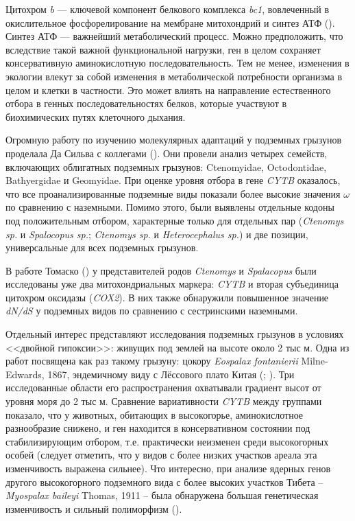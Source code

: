 Цитохром \textit{b} --- ключевой компонент белкового комплекса \textit{bc1}, вовлеченный в окислительное фосфорелирование на мембране митохондрий и синтез АТФ (\cite{Tomasco2014}). Синтез АТФ --- важнейший метаболический процесс. Можно предположить, что вследствие такой важной функциональной нагрузки, ген в целом сохраняет консервативную аминокислотную последовательность. Тем не менее, изменения в экологии влекут за собой изменения в метаболической потребности организма в целом и клетки в частности. Это может влиять на направление естественного отбора в генных последовательностях белков, которые участвуют в биохимических путях клеточного дыхания.

Огромную работу по изучению молекулярных адаптаций у подземных грызунов проделала Да Сильва с коллегами (\cite{DaSilva2009}). Они провели анализ четырех семейств, включающих облигатных подземных грызунов: Ctenomyidae, Octodontidae, Bathyergidae и Geomyidae. При оценке уровня отбора в гене \textit{CYTB} оказалось, что все проанализированные подземные виды показали более высокие значения $\omega$ по сравнению с наземными. Помимо этого, были выявлены отдельные кодоны под положительным отбором, характерные только для отдельных пар (\textit{Ctenomys sp.} и \textit{Spalocopus sp.}; \textit{Ctenomys sp.} и \textit{Heterocephalus sp.}) и две позиции, универсальные для всех подземных грызунов.

В работе Томаско (\cite{Tomasco2014}) у представителей родов \textit{Ctenomys} и \textit{Spalacopus} были исследованы уже два митохондриальных маркера: \textit{CYTB} и вторая субъединица цитохром оксидазы (\textit{COX2}). В них также обнаружили повышенное значение \textit{dN/dS} у подземных видов по сравнению с сестринскими наземными.

Отдельный интерес представляют исследования подземных грызунов в условиях <<двойной гипоксии>>: живущих под землей на высоте около 2 тыс м. Одна из работ посвящена как раз такому грызуну: цокору \textit{Eospalax fontanierii} Milne-Edwards, 1867, эндемичному виду с Лёссового плато Китая (\cite{Zhang2013a}; \cite{Li1989}). Три исследованные области его распространения охватывали градиент высот от уровня моря до 2 тыс м. Сравнение вариативности \textit{CYTB} между группами показало, что у животных, обитающих в высокогорье, аминокислотное разнообразие снижено, и ген находится в консервативном состоянии под стабилизирующим отбором, т.е. практически неизменен среди высокогорных особей (следует отметить, что у видов с более низких участков ареала эта изменчивость выражена сильнее). Что интересно, при анализе ядерных генов другого высокогорного подземного вида с более высоких участков Тибета -- \textit{Myospalax baileyi} Thomas, 1911 -- была обнаружена большая генетическая изменчивость и сильный полиморфизм (\cite{Cai2018}).

